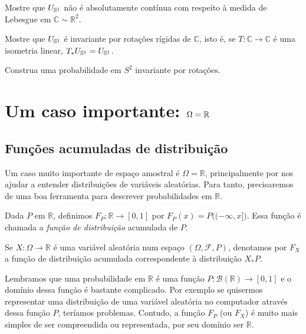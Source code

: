 \begin{exercise}
  Mostre que $U_{{\mathbb S}^1}$ não é absolutamente contínua com respeito à medida de Lebesgue em $\mathbb{C} \sim \mathbb{R}^2$.
\end{exercise}

\begin{exercise}
  Mostre que $U_{{\mathbb S}^1}$ é invariante por rotações rígidas de $\mathbb{C}$, isto é, se $T:\mathbb{C} \to \mathbb{C}$ é uma isometria linear,
  $T_*U_{{\mathbb S}^1}=U_{{\mathbb S}^1}$.
\end{exercise}

\begin{exercise}
  Construa uma probabilidade em $S^2$ invariante por rotações.
\end{exercise}

\section{Um caso importante: $\Omega={\mathbb R}$}

\subsection{Funções acumuladas de distribuição}

Um caso muito importante de espaço amostral é $\Omega = \mathbb{R}$, principalmente por nos ajudar a entender distribuições de variáveis aleatórias.
Para tanto, precisaremos de uma boa ferramenta para descrever probabilidades em $\mathbb{R}$.

\begin{definition}
  Dada $P$ em $\mathbb{R}$, definimos $F_P:\mathbb{R} \to [0,1]$ por $F_P(x) = P\big((-\infty, x]\big)$.
  Essa função é chamada a \emph{função de distribuição} acumulada de $P$. 
\end{definition}

\begin{notation}
  Se $X:\Omega \to \mathbb{R}$ é uma variável aleatória num espaço $(\Omega, \mathcal{F}, P)$, denotamos por $F_X$ 
  a função de distribuição acumulada correspondente à distribuição $X_*P$.
\end{notation}

Lembramos que uma probabilidade em $\mathbb{R}$ é uma função $P:\mathcal{B}(\mathbb{R}) \to [0,1]$ e o domínio dessa função é bastante complicado.
Por exemplo se quisermos representar uma distribuição de uma variável aleatória no computador através dessa função $P$, teríamos problemas.
Contudo, a função $F_P$ (ou $F_X$) é muito mais simples de ser compreendida ou representada, por seu domínio ser $\mathbb{R}$.

